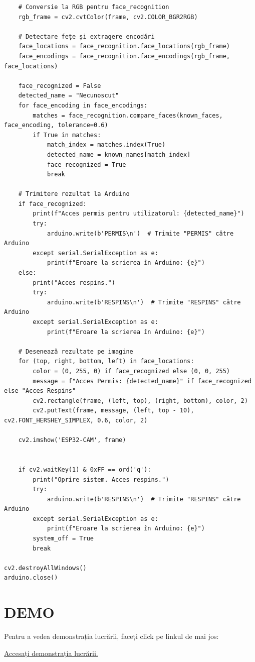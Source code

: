 \documentclass[a4paper,12pt]{report}
\begin{document}
\begin{lstlisting}
    # Conversie la RGB pentru face_recognition
    rgb_frame = cv2.cvtColor(frame, cv2.COLOR_BGR2RGB)

    # Detectare fețe și extragere encodări
    face_locations = face_recognition.face_locations(rgb_frame)
    face_encodings = face_recognition.face_encodings(rgb_frame, face_locations)

    face_recognized = False
    detected_name = "Necunoscut"
    for face_encoding in face_encodings:
        matches = face_recognition.compare_faces(known_faces, face_encoding, tolerance=0.6)
        if True in matches:
            match_index = matches.index(True)
            detected_name = known_names[match_index]
            face_recognized = True
            break

    # Trimitere rezultat la Arduino
    if face_recognized:
        print(f"Acces permis pentru utilizatorul: {detected_name}")
        try:
            arduino.write(b'PERMIS\n')  # Trimite "PERMIS" către Arduino
        except serial.SerialException as e:
            print(f"Eroare la scrierea în Arduino: {e}")
    else:
        print("Acces respins.")
        try:
            arduino.write(b'RESPINS\n')  # Trimite "RESPINS" către Arduino
        except serial.SerialException as e:
            print(f"Eroare la scrierea în Arduino: {e}")

    # Desenează rezultate pe imagine
    for (top, right, bottom, left) in face_locations:
        color = (0, 255, 0) if face_recognized else (0, 0, 255)
        message = f"Acces Permis: {detected_name}" if face_recognized else "Acces Respins"
        cv2.rectangle(frame, (left, top), (right, bottom), color, 2)
        cv2.putText(frame, message, (left, top - 10), cv2.FONT_HERSHEY_SIMPLEX, 0.6, color, 2)

    cv2.imshow('ESP32-CAM', frame)


    if cv2.waitKey(1) & 0xFF == ord('q'):
        print("Oprire sistem. Acces respins.")
        try:
            arduino.write(b'RESPINS\n')  # Trimite "RESPINS" către Arduino
        except serial.SerialException as e:
            print(f"Eroare la scrierea în Arduino: {e}")
        system_off = True
        break

cv2.destroyAllWindows()
arduino.close()

\end{lstlisting}



\chapter*{DEMO}
Pentru a vedea demonstrația lucrării, faceți click pe linkul de mai jos:

\href{https://drive.google.com/file/d/1Arq4-t9W6Yy230FEhRUdlKgxsrljPZj3/view?usp=sharing}{Accesați demonstrația lucrării.}
\end{document}
